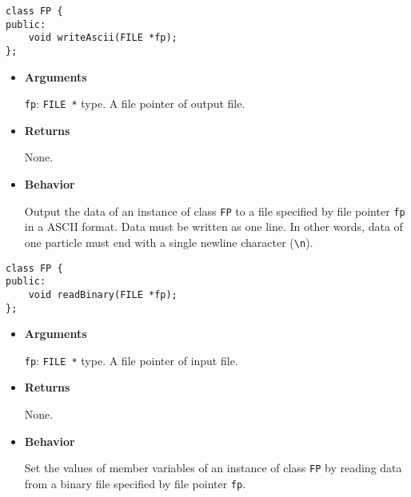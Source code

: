 \label{sec:FP_writeAscii}

\begin{screen}
\begin{verbatim}
class FP {
public:
    void writeAscii(FILE *fp);
};
\end{verbatim}
\end{screen}

\begin{itemize}

\item {\bf Arguments}

  \texttt{fp}: \texttt{FILE *} type. A file pointer of output file.
  
\item {\bf Returns}

  None.
  
\item {\bf Behavior}


  Output the data of an instance of class \texttt{FP} to a file specified by file pointer \texttt{fp} in a ASCII format. Data must be written as one line. In other words, data of one particle must end with a single newline character (\texttt{\textbackslash n}).
  
\end{itemize}

\label{sec:FP_readBinary}

\begin{screen}
\begin{verbatim}
class FP {
public:
    void readBinary(FILE *fp);
};
\end{verbatim}
\end{screen}

\begin{itemize}

\item {\bf Arguments}

  \texttt{fp}: \texttt{FILE *} type. A file pointer of input file.

\item {\bf Returns}

  None.
  
\item {\bf Behavior}

  Set the values of member variables of an instance of class \texttt{FP} by reading data from a binary file specified by file pointer \texttt{fp}.
  
\end{itemize}

